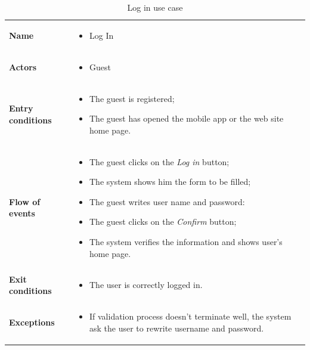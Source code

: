 \begin{table}
\begin{center}
\begin{tabular}{lp{}}
\toprule
\textbf{Name}		&	\begin{itemize}
					\item Log In
					\end{itemize}	\\
\textbf{Actors}		&	\begin{itemize}
					\item Guest
					\end{itemize}	\\
\textbf{Entry conditions}	&	\begin{itemize}
					\item The guest is registered;
					\item	The guest has opened the mobile app or the web site home page.
					\end{itemize}	\\
\textbf{Flow of events}	&	\begin{itemize}
					\item	The guest clicks on the \emph{Log in} button;
					\item	The system shows him the form to be filled;
					\item	The guest writes user name and password:
					\item	The guest clicks on the \emph{Confirm} button;
					\item	The system verifies the information and shows user's home page.
					\end{itemize}	\\
\textbf{Exit conditions}	&	\begin{itemize}
					\item	The user is correctly logged in.
					\end{itemize}	\\
\textbf{Exceptions}	&	\begin{itemize}
					\item If validation process doesn't terminate well, the system ask the user to rewrite username and password.
					\end{itemize}	\\
\bottomrule
\end{tabular}
\caption{Log in use case}
\end{center}
\end{table}

